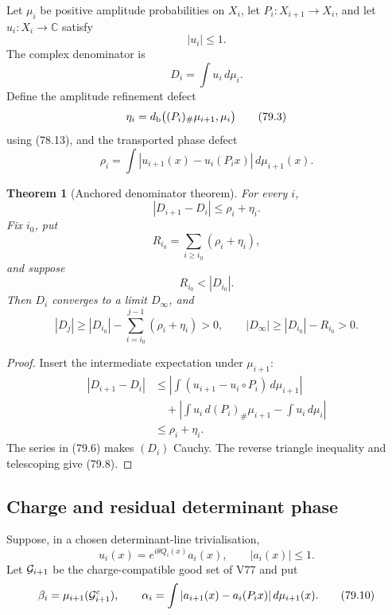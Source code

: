 \documentclass[11pt]{article}
\newtheorem{theorem}{Theorem}[section]
\begin{document}
Let \(\mu_i\) be positive amplitude probabilities on \(X_i\), let
\(P_i:X_{i+1}\to X_i\), and let \(u_i:X_i\to\mathbb C\) satisfy
\[
                                  |u_i|\le1.                  \tag{79.1}
\]
The complex denominator is
\[
                                  D_i=\int u_i\,d\mu_i.        \tag{79.2}
\]
Define the amplitude refinement defect
\[
 \eta_i=d_{\rm b}\big((P_i)_\#\mu_{i+1},\mu_i\big)            \tag{79.3}
\]
using (78.13), and the transported phase defect
\[
 \rho_i=\int
        |u_{i+1}(x)-u_i(P_ix)|\,d\mu_{i+1}(x).                \tag{79.4}
\]

\begin{theorem}[Anchored denominator theorem]
\label{thm:v11v79-anchor}
For every \(i\),
\[
                                  |D_{i+1}-D_i|
                                  \le\rho_i+\eta_i.            \tag{79.5}
\]
Fix \(i_0\), put
\[
                        R_{i_0}=\sum_{i\ge i_0}(\rho_i+\eta_i),
                                                                    \tag{79.6}
\]
and suppose
\[
                             R_{i_0}<|D_{i_0}|.               \tag{79.7}
\]
Then \(D_i\) converges to a limit \(D_\infty\), and
\[
 |D_j|\ge |D_{i_0}|-\sum_{i=i_0}^{j-1}(\rho_i+\eta_i)>0,
 \qquad
 |D_\infty|\ge|D_{i_0}|-R_{i_0}>0.                           \tag{79.8}
\]
\end{theorem}

\begin{proof}
Insert the intermediate expectation under \(\mu_{i+1}\):
\[
 \begin{split}
 |D_{i+1}-D_i|
 &\le\left|\int(u_{i+1}-u_i\circ P_i)\,d\mu_{i+1}\right|\\
 &\quad+
 \left|\int u_i\,d(P_i)_\#\mu_{i+1}-\int u_i\,d\mu_i\right|\\
 &\le\rho_i+\eta_i.
 \end{split}
\]
The series in (79.6) makes \((D_i)\) Cauchy.  The reverse triangle
inequality and telescoping give (79.8).
\end{proof}

\subsection{Charge and residual determinant phase}

Suppose, in a chosen determinant-line trivialisation,
\[
                         u_i(x)=e^{i\theta Q_i(x)}a_i(x),
                  \qquad |a_i(x)|\le1.                       \tag{79.9}
\]
Let \({\cal G}_{i+1}\) be the charge-compatible good set of V77 and
put
\[
 \beta_i=\mu_{i+1}({\cal G}_{i+1}^c),\qquad
 \alpha_i=\int|a_{i+1}(x)-a_i(P_ix)|\,d\mu_{i+1}(x).          \tag{79.10}
\]
\end{document}
